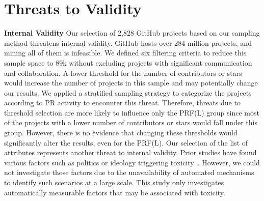 \section{Threats to Validity}
\label{sec:threats}
\noindent \textbf{Internal Validity}
Our selection of 2,828 GitHub projects based on our sampling method threatens internal validity. GitHub hosts over 284 million projects, and mining all of them is infeasible. We defined six filtering criteria to reduce this sample space to 89k without excluding projects with significant communication and collaboration. A lower threshold for the number of contributors or stars would increase the number of projects in this sample and may potentially change our results. 
We applied a stratified sampling strategy to categorize the projects according to PR activity to encounter this threat. Therefore, threats due to threshold selection are more likely to influence only the PRF(L) group since most of the projects with a lower number of contributors or stars would fall under this group. However, there is no evidence that changing these thresholds would significantly alter the results, even for the PRF(L). Our selection of the list of attributes represents another threat to internal validity. Prior studies have found various factors such as politics or ideology triggering toxicity~\cite{miller2022did}. However, we could not investigate those factors due to the unavailability of automated mechanisms to identify such scenarios at a large scale.  This study only investigates automatically measurable factors that may be associated with toxicity. 





